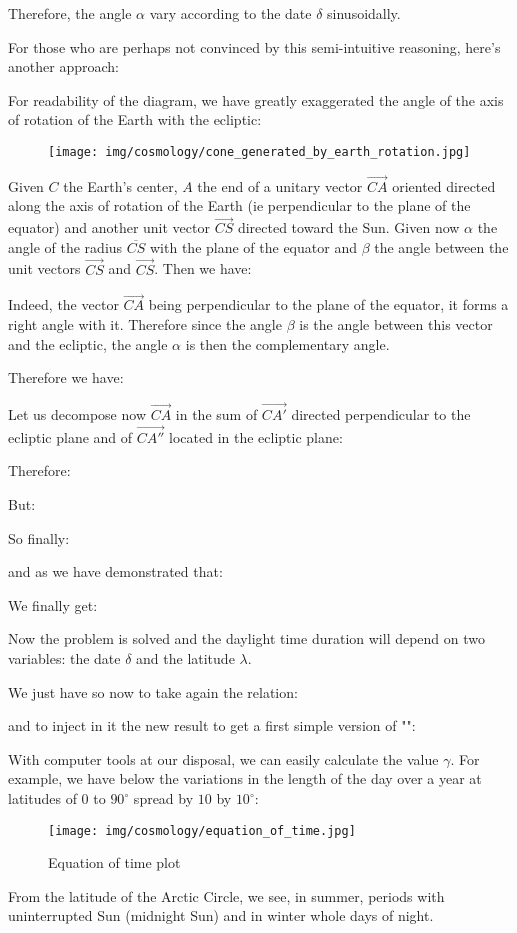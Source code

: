 	Therefore, the angle $\alpha$ vary according to the date $\delta$ sinusoidally.

	For those who are perhaps not convinced by this semi-intuitive reasoning, here's another approach:

	For readability of the diagram, we have greatly exaggerated the angle of the axis of rotation of the Earth with the ecliptic:
	\begin{figure}[H]
		\centering
		\texttt{[image: img/cosmology/cone\_generated\_by\_earth\_rotation.jpg]}
	\end{figure}
	Given $C$ the Earth's center, $A$ the end of a unitary vector $\overrightarrow{CA}$ oriented directed along the axis of rotation of the Earth (ie perpendicular to the plane of the equator) and another unit vector $\overrightarrow{CS}$ directed toward the Sun. Given now $\alpha$ the angle of the radius $\overline{CS}$  with the plane of the equator and $\beta$ the angle between the unit vectors  $\overrightarrow{CS}$ and  $\overrightarrow{CS}$. Then we have:
	
	Indeed, the vector $\overrightarrow{CA}$ being perpendicular to the plane of the equator, it forms a right angle with it. Therefore since the angle $\beta$ is the angle between this vector and the ecliptic, the angle $\alpha$ is then the complementary angle.
	
	Therefore we have:
	
	Let us decompose now $\overrightarrow{CA}$ in the sum of $\overrightarrow{CA'}$ directed perpendicular to the ecliptic plane and of $\overrightarrow{CA''}$ located in the ecliptic plane:
	
	Therefore:
	
	But:
	
	So finally:
	
	and as we have demonstrated that:
	
	We finally get:
	
	Now the problem is solved and the daylight time duration will depend on two variables: the date $\delta$ and the latitude $\lambda$.

	We just have so now to take again the relation:
	
	and to inject in it the new result to get a first simple version of "":
	
	With computer tools at our disposal, we can easily calculate the value $\gamma$. For example, we have below the variations in the length of the day over a year at latitudes of $0$ to $90^\circ$ spread by $10$ by $10^\circ$:
	\begin{figure}[H]
		\centering
		\texttt{[image: img/cosmology/equation\_of\_time.jpg]}
		\caption{Equation of time plot}
	\end{figure}
	From the latitude of the Arctic Circle, we see, in summer, periods with uninterrupted Sun (midnight Sun) and in winter whole days of night.

